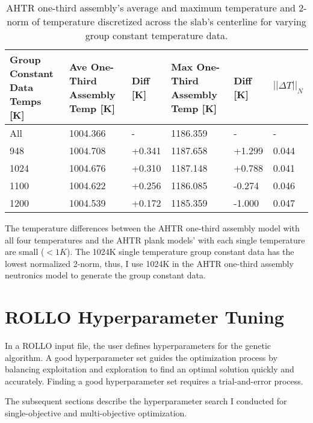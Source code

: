 \begin{table}[htbp]
    \centering
    \onehalfspacing
    \caption{AHTR one-third assembly's average and maximum temperature and 2-norm of 
    temperature discretized across the slab's centerline for varying group constant 
    temperature data.}
	\label{tab:moltres-group-constant-temps-assem}
    \scriptsize
    \begin{tabular}{p{2.5cm}p{2.5cm}p{2cm}p{2.5cm}p{2cm}p{2cm}}
    \hline 
    \textbf{Group Constant Data Temps [K]}& \textbf{Ave One-Third Assembly Temp [K]}& 
    \textbf{Diff [K]}& \textbf{Max One-Third Assembly Temp [K]} & 
    \textbf{Diff [K]} & $||\Delta T||_N$ \\ 
    \hline 
    All  & 1004.366 &  -     & 1186.359 & -      & -    \\
    948 & 1004.708 & +0.341 & 1187.658 & +1.299 & 0.044 \\
    1024 & 1004.676 & +0.310 & 1187.148 & +0.788 & 0.041 \\
    1100 & 1004.622 & +0.256 & 1186.085 & -0.274 & 0.046\\
    1200 & 1004.539 & +0.172 & 1185.359 & -1.000 & 0.047 \\
    \hline
    \end{tabular}
\end{table}
The temperature differences between the AHTR one-third assembly model with all four 
temperatures and the AHTR plank models' with each single temperature are small ($<1K$). 
The 1024K single temperature group constant data has the lowest normalized 2-norm, thus, I 
use 1024K in the \gls{AHTR} one-third assembly neutronics model to generate the group 
constant data.

\section{ROLLO Hyperparameter Tuning}
\label{sec:hyperparameter-studies}
In a \gls{ROLLO} input file, the user defines hyperparameters for the genetic 
algorithm.
A good hyperparameter set guides the optimization process by 
balancing exploitation and exploration to find an optimal solution quickly 
and accurately. 
Finding a good hyperparameter set requires a trial-and-error process. 

The subsequent sections describe the hyperparameter search I conducted for single-objective 
and multi-objective optimization. 

